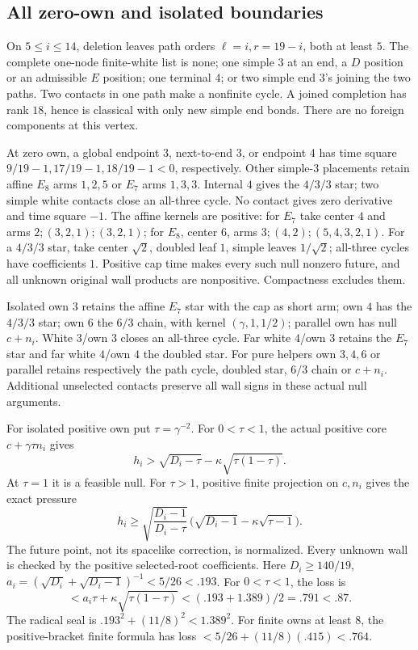 \documentclass[11pt]{article}
\theoremstyle{definition}
\theoremstyle{remark}
\begin{document}
\subsection{All zero-own and isolated boundaries}
On \(5\leq i\leq14\), deletion leaves path orders
\(\ell=i,r=19-i\), both at least \(5\).
The complete one-node finite-white list is none;
one simple \(3\) at an end, a \(D\) position or an
admissible \(E\) position; one terminal \(4\);
or two simple end \(3\)'s joining the two paths.
Two contacts in one path make a nonfinite cycle.
A joined completion has rank \(18\), hence is
classical with only new simple end bonds.
There are no foreign components at this vertex.

At zero own, a global endpoint \(3\), next-to-end
\(3\), or endpoint \(4\) has time square
\(9/19-1,17/19-1,18/19-1<0\), respectively.
Other simple-\(3\) placements retain affine
\(E_8\) arms \(1,2,5\) or \(E_7\) arms \(1,3,3\).
Internal \(4\) gives the \(4/3/3\) star; two
simple white contacts close an all-three cycle.
No contact gives zero derivative and time square \(-1\).
The affine kernels are positive: for \(E_7\)
take center \(4\) and arms \(2;(3,2,1);(3,2,1)\);
for \(E_8\), center \(6\), arms
\(3;(4,2);(5,4,3,2,1)\).
For a \(4/3/3\) star, take center \(\sqrt2\),
doubled leaf \(1\), simple leaves \(1/\sqrt2\);
all-three cycles have coefficients \(1\).
Positive cap time makes every such null nonzero
future, and all unknown original wall products
are nonpositive. Compactness excludes them.

Isolated own \(3\) retains the affine \(E_7\)
star with the cap as short arm; own \(4\) has
the \(4/3/3\) star; own \(6\) the \(6/3\) chain,
with kernel \((\gamma,1,1/2)\); parallel own
has null \(c+n_i\).
White \(3\)/own \(3\) closes an all-three cycle.
Far white \(4\)/own \(3\) retains the \(E_7\)
star and far white \(4\)/own \(4\) the doubled
star. For pure helpers own \(3,4,6\) or parallel
retains respectively the path cycle, doubled
star, \(6/3\) chain or \(c+n_i\).
Additional unselected contacts preserve all
wall signs in these actual null arguments.

For isolated positive own put \(\tau=\gamma^{-2}\).
For \(0<\tau<1\), the actual positive core
\(c+\gamma\tau n_i\) gives
\[
 h_i>\sqrt{D_i-\tau}
           -\kappa\sqrt{\tau(1-\tau)}.
\]
At \(\tau=1\) it is a feasible null.
For \(\tau>1\), positive finite projection on
\(c,n_i\) gives the exact pressure
\[
 h_i\geq
 \sqrt{\frac{D_i-1}{D_i-\tau}}\,
       \bigl(\sqrt{D_i-1}-\kappa\sqrt{\tau-1}\bigr).
\]
The future point, not its spacelike correction,
is normalized. Every unknown wall is checked
by the positive selected-root coefficients.
Here \(D_i\geq140/19\),
\(a_i=(\sqrt{D_i}+\sqrt{D_i-1})^{-1}<5/26<.193\).
For \(0<\tau<1\), the loss is
\[
 <a_i\tau+\kappa\sqrt{\tau(1-\tau)}
 <(.193+1.389)/2=.791<.87.
\]
The radical seal is \(.193^2+(11/8)^2<1.389^2\).
For finite owns at least \(8\), the positive-bracket
finite formula has loss
\(<5/26+(11/8)(.415)<.764\).
\end{document}
